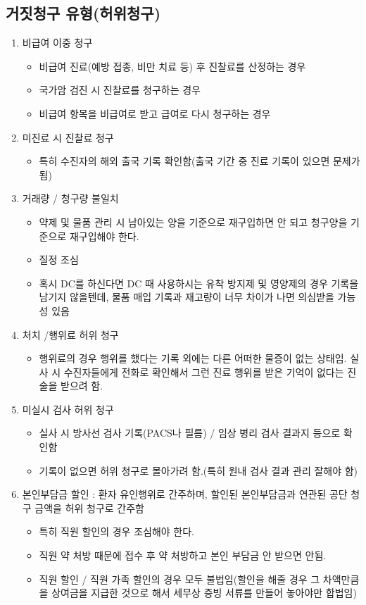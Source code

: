 \subsection{거짓청구 유형(허위청구)}
\begin{enumerate}[①]\tightlist
\item 비급여 이중 청구
	\begin{itemize}\tightlist
	\item 비급여 진료(예방 접종, 비만 치료 등) 후 진찰료를 산정하는 경우
	\item 국가암 검진 시 진찰료를 청구하는 경우
	\item 비급여 항목을 비급여로 받고 급여로 다시 청구하는 경우
	\end{itemize}	
\item 미진료 시 진찰료 청구
	\begin{itemize}\tightlist
	\item 특히 수진자의 해외 출국 기록 확인함(출국 기간 중 진료 기록이 있으면 문제가 됨)
	\end{itemize}	
\item 거래량 / 청구량 불일치
	\begin{itemize}\tightlist
	\item 약제 및 물품 관리 시 남아있는 양을 기준으로 재구입하면 안 되고 청구양을 기준으로 재구입해야 한다.
	\item 질정 조심
	\item 혹시 DC를 하신다면 DC 때 사용하시는 유착 방지제 및 영양제의 경우 기록을 남기지 않을텐데, 물품 매입 기록과 재고량이 너무 차이가 나면 의심받을 가능성 있음
	\end{itemize}	
\item 처치 /행위료 허위 청구
	\begin{itemize}\tightlist
	\item 행위료의 경우 행위를 했다는 기록 외에는 다른 어떠한 물증이 없는 상태임. 실사 시 수진자들에게 전화로 확인해서 그런 진료 행위를 받은 기억이 없다는 진술을 받으려 함.
	\end{itemize}	
\item 미실시 검사 허위 청구
	\begin{itemize}\tightlist
	\item 실사 시 방사선 검사 기록(PACS나 필름) / 임상 병리 검사 결과지 등으로 확인함
	\item 기록이 없으면 허위 청구로 몰아가려 함.(특히 원내 검사 결과 관리 잘해야 함)
	\end{itemize}	
\item 본인부담금 할인 : 환자 유인행위로 간주하며, 할인된 본인부담금과 연관된 공단 청구 금액을 허위 청구로 간주함
	\begin{itemize}\tightlist
	\item 특히 직원 할인의 경우 조심해야 한다.
	\item 직원 약 처방 때문에 접수 후 약 처방하고 본인 부담금 안 받으면 안됨.
	\item 직원 할인 / 직원 가족 할인의 경우 모두 불법임(할인을 해줄 경우 그 차액만큼을 상여금을 지급한 것으로 해서 세무상 증빙 서류를 만들어 놓아야만 합법임)
	\end{itemize}
\end{enumerate}

